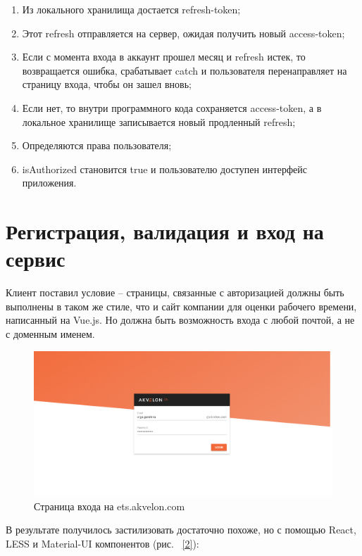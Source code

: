 \documentclass[14pt, a4paper]{diplom}
\begin{document}
\begin{enumerate}
\item Из локального хранилища достается refresh-token;
\item Этот refresh отправляется на сервер, ожидая получить новый access-token;
\item Если с момента входа в аккаунт прошел месяц и refresh истек, то возвращается ошибка, срабатывает catch и пользователя перенаправляет на страницу входа, чтобы он зашел вновь;
\item Если нет, то внутри программного кода сохраняется access-token, а в локальное хранилище записывается новый продленный refresh;
\item Определяются права пользователя;
\item isAuthorized становится true и пользователю доступен интерфейс приложения.

\end{enumerate}

\section{Регистрация, валидация и вход на сервис}

Клиент поставил условие -- страницы, связанные с авторизацией должны быть выполнены в таком же стиле, что и сайт компании для
оценки рабочего времени, написанный на Vue.js. Но должна быть возможность входа с любой почтой, а не с доменным именем.

\begin{figure}[!ht]
\centering
\includegraphics[width=1\textwidth]{resources/ets.png}
\caption{Страница входа на ets.akvelon.com}
\label{fig:1}
\end{figure}

В результате получилось застилизовать достаточно похоже, но с помощью React, LESS и Material-UI компонентов (рис. ~\ref{2}):
\end{document}
